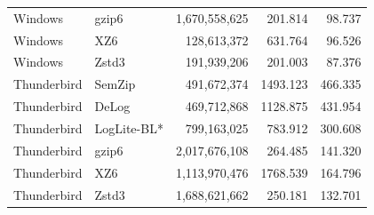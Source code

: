 \begin{longtable}{llrrr}
Windows & gzip6 & 1,670,558,625 & 201.814 & 98.737 \\
Windows & XZ6 & 128,613,372 & 631.764 & 96.526 \\
Windows & Zstd3 & 191,939,206 & 201.003 & 87.376 \\
Thunderbird & SemZip & 491,672,374 & 1493.123 & 466.335 \\
Thunderbird & DeLog & 469,712,868 & 1128.875 & 431.954 \\
Thunderbird & LogLite-BL* & 799,163,025 & 783.912 & 300.608 \\
Thunderbird & gzip6 & 2,017,676,108 & 264.485 & 141.320 \\
Thunderbird & XZ6 & 1,113,970,476 & 1768.539 & 164.796 \\
Thunderbird & Zstd3 & 1,688,621,662 & 250.181 & 132.701 \\
\bottomrule\end{longtable}
